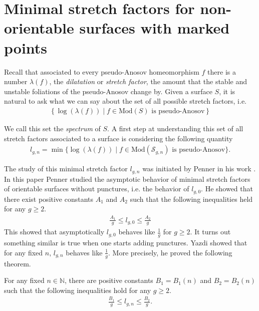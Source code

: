 \section{Minimal stretch factors for non-orientable surfaces with marked points}
\label{sec:application}

Recall that associated to every pseudo-Anosov homeomorphism $f$ there is a number $\lambda(f)$, the
\textit{dilatation} or \textit{stretch factor}, the amount that the stable and unstable foliations of the
pseudo-Anosov change by. Given a surface $S$, it is natural to ask what we can say about the set of all
possible stretch factors, i.e.
\begin{align*}
    \left\{\log(\lambda(f)) \mid f \in \text{Mod}(S) \text{ is pseudo-Anosov}\right\}
\end{align*}

We call this set the \textit{spectrum} of $S$. A first step at understanding this set of all stretch factors
associated to a surface is considering the following quantity
\begin{align*}
    l_{g,n} =\min\{\log(\lambda(f)) \mid f \in \text{Mod}(\mathcal{S}_{g,n}) \text{ is pseudo-Anosov}\}.
\end{align*}

The study of this minimal stretch factor $l_{g,n}$ was initiated by Penner in his work
\cite{penner1991bounds}. In this paper Penner studied the asymptotic behavior of minimal stretch factors of orientable surfaces without punctures, i.e. the behavior of $l_{g,0}$. He showed that there exist positive constants
$A_1$ and $A_2$ such that the following inequalities held for any $g \geq 2$.
\begin{align*}
    \frac{A_1}{g} \leq l_{g,0} \leq \frac{A_2}{g}
\end{align*}
This showed that asymptotically $l_{g,0}$ behaves like $\frac{1}{g}$ for $g \geq 2$.
It turns out something similar is true when one starts adding punctures. Yazdi showed
that for any fixed $n$, $l_{g,n}$ behaves like $\frac{1}{g}$. More precisely, he proved the following theorem.
\begin{thm}
\label{thm:yazdi1}
For any fixed $n \in \mathbb{N}$, there are positive constants $B_1 = B_1(n)$ and $B_2 = B_2(n)$ such that the following inequalities hold for
any $g \geq 2$.
\begin{align*}
    \frac{B_1}{g} \leq l_{g,n} \leq \frac{B_2}{g}.
\end{align*}
\end{thm}

